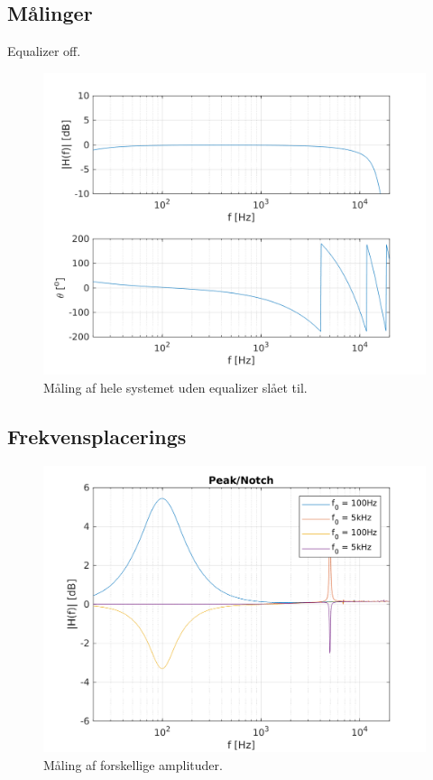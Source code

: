 \subsection{Målinger}
Equalizer off.
\begin{figure}[h]
\centering
\includegraphics[scale = 0.8]{matlabdemo/test/test_eq_off.png}  
\caption{Måling af hele systemet uden equalizer slået til.}
\end{figure}

\subsection{Frekvensplacerings}


\begin{figure}[h]
\centering
\includegraphics[scale = 0.8]{matlabdemo/test/test_freq_peak.png}
\caption{Måling af forskellige amplituder.}
\end{figure}




